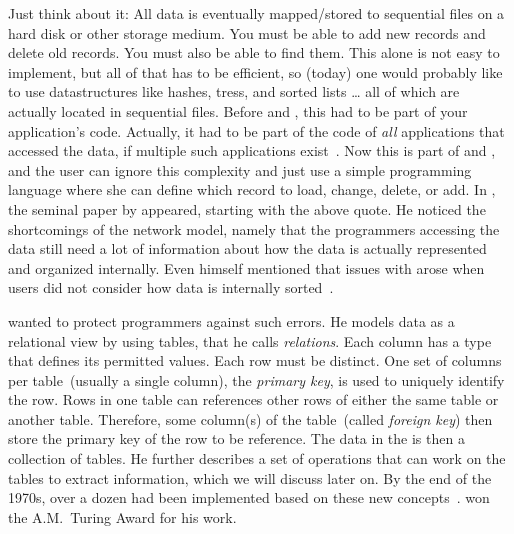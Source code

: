 Just think about it:
All data is eventually mapped/stored to sequential files on a hard disk or other storage medium.
You must be able to add new records and delete old records.
You must also be able to find them.
This alone is not easy to implement, but all of that has to be efficient, so (today) one would probably like to use datastructures like hashes, tress, and sorted lists {\dots} all of which are actually located in sequential files.
Before  and , this had to be part of your application's code.
Actually, it had to be part of the code of \emph{all} applications that accessed the data, if multiple such applications exist~\cite{BBP2007TBOI}.
Now this is part of  and , and the user can ignore this complexity and just use a simple programming language where she can define which record to load, change, delete, or add.%
%
%
%
In \citeyear{C1970ARMODFLSDB}, the seminal paper \emph{} by \citeauthor{C1970ARMODFLSDB} appeared, starting with the above quote.
He noticed the shortcomings of the  network model, namely that the programmers accessing the data still need a lot of information about how the data is actually represented and organized internally.
Even \citeauthor{B2009TOOTIDSITFDAD} himself mentioned that issues with  arose when users did not consider how data is internally sorted~\cite{B2009TOOTIDSITFDAD}.

 wanted to protect programmers against such errors.
He models data as a relational view by using tables, that he calls \emph{relations}.
Each column has a type that defines its permitted values.
Each row must be distinct.
One set of columns per table~(usually a single column), the \emph{primary key}, is used to uniquely identify the row.
Rows in one table can references other rows of either the same table or another table.
Therefore, some column(s) of the table~(called \emph{foreign key}) then store the primary key of the row to be reference.
The data in the  is then a collection of tables.
He further describes a set of operations that can work on the tables to extract information, which we will discuss later on.
By the end of the 1970s, over a dozen  had been implemented based on these new concepts~\cite{K1979RDS}.
 won the A.M.~Turing Award for his work.

